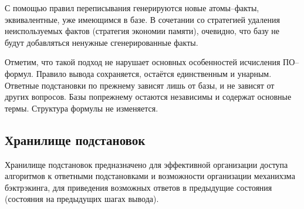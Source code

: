 С помощью правил переписывания генерируются новые атомы--факты, эквивалентные, уже имеющимся в базе. В сочетании со стратегией удаления неиспользуемых фактов (стратегия экономии памяти), очевидно, что базу не будут добавляться ненужные сгенерированные факты.

Отметим, что такой подход не нарушает основных особенностей исчисления ПО--формул. Правило вывода сохраняется, остаётся единственным и унарным. Ответные подстановки по прежнему зависят лишь от базы, и не зависят от других вопросов. Базы попрежнему остаются независимы и содержат основные термы. Структура формулы не изменяется.






\subsection{Хранилище подстановок}
Хранилище подстановок предназначено для эффективной организации доступа алгоритмов к ответными подстановками и возможности организации механихзма бэктрэкинга, для приведения возможных ответов в предыдущие состояния (состояния на предыдущих шагах вывода).

